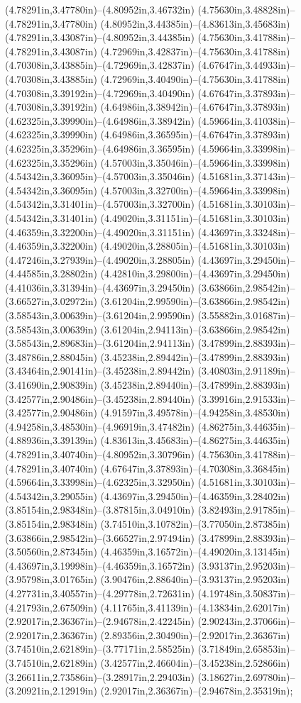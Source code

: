 (4.78291in,3.47780in)--(4.80952in,3.46732in) (4.75630in,3.48828in)--(4.78291in,3.47780in) (4.80952in,3.44385in)--(4.83613in,3.45683in) (4.78291in,3.43087in)--(4.80952in,3.44385in) (4.75630in,3.41788in)--(4.78291in,3.43087in) (4.72969in,3.42837in)--(4.75630in,3.41788in) (4.70308in,3.43885in)--(4.72969in,3.42837in) (4.67647in,3.44933in)--(4.70308in,3.43885in) (4.72969in,3.40490in)--(4.75630in,3.41788in) (4.70308in,3.39192in)--(4.72969in,3.40490in) (4.67647in,3.37893in)--(4.70308in,3.39192in) (4.64986in,3.38942in)--(4.67647in,3.37893in) (4.62325in,3.39990in)--(4.64986in,3.38942in) (4.59664in,3.41038in)--(4.62325in,3.39990in) (4.64986in,3.36595in)--(4.67647in,3.37893in) (4.62325in,3.35296in)--(4.64986in,3.36595in) (4.59664in,3.33998in)--(4.62325in,3.35296in) (4.57003in,3.35046in)--(4.59664in,3.33998in) (4.54342in,3.36095in)--(4.57003in,3.35046in) (4.51681in,3.37143in)--(4.54342in,3.36095in) (4.57003in,3.32700in)--(4.59664in,3.33998in) (4.54342in,3.31401in)--(4.57003in,3.32700in) (4.51681in,3.30103in)--(4.54342in,3.31401in) (4.49020in,3.31151in)--(4.51681in,3.30103in) (4.46359in,3.32200in)--(4.49020in,3.31151in) (4.43697in,3.33248in)--(4.46359in,3.32200in) (4.49020in,3.28805in)--(4.51681in,3.30103in) (4.47246in,3.27939in)--(4.49020in,3.28805in) (4.43697in,3.29450in)--(4.44585in,3.28802in) (4.42810in,3.29800in)--(4.43697in,3.29450in) (4.41036in,3.31394in)--(4.43697in,3.29450in) (3.63866in,2.98542in)--(3.66527in,3.02972in) (3.61204in,2.99590in)--(3.63866in,2.98542in) (3.58543in,3.00639in)--(3.61204in,2.99590in) (3.55882in,3.01687in)--(3.58543in,3.00639in) (3.61204in,2.94113in)--(3.63866in,2.98542in) (3.58543in,2.89683in)--(3.61204in,2.94113in) (3.47899in,2.88393in)--(3.48786in,2.88045in) (3.45238in,2.89442in)--(3.47899in,2.88393in) (3.43464in,2.90141in)--(3.45238in,2.89442in) (3.40803in,2.91189in)--(3.41690in,2.90839in) (3.45238in,2.89440in)--(3.47899in,2.88393in) (3.42577in,2.90486in)--(3.45238in,2.89440in) (3.39916in,2.91533in)--(3.42577in,2.90486in) (4.91597in,3.49578in)--(4.94258in,3.48530in) (4.94258in,3.48530in)--(4.96919in,3.47482in) (4.86275in,3.44635in)--(4.88936in,3.39139in) (4.83613in,3.45683in)--(4.86275in,3.44635in) (4.78291in,3.40740in)--(4.80952in,3.30796in) (4.75630in,3.41788in)--(4.78291in,3.40740in) (4.67647in,3.37893in)--(4.70308in,3.36845in) (4.59664in,3.33998in)--(4.62325in,3.32950in) (4.51681in,3.30103in)--(4.54342in,3.29055in) (4.43697in,3.29450in)--(4.46359in,3.28402in) (3.85154in,2.98348in)--(3.87815in,3.04910in) (3.82493in,2.91785in)--(3.85154in,2.98348in) (3.74510in,3.10782in)--(3.77050in,2.87385in) (3.63866in,2.98542in)--(3.66527in,2.97494in) (3.47899in,2.88393in)--(3.50560in,2.87345in) (4.46359in,3.16572in)--(4.49020in,3.13145in) (4.43697in,3.19998in)--(4.46359in,3.16572in) (3.93137in,2.95203in)--(3.95798in,3.01765in) (3.90476in,2.88640in)--(3.93137in,2.95203in) (4.27731in,3.40557in)--(4.29778in,2.72631in) (4.19748in,3.50837in)--(4.21793in,2.67509in) (4.11765in,3.41139in)--(4.13834in,2.62017in) (2.92017in,2.36367in)--(2.94678in,2.42245in) (2.90243in,2.37066in)--(2.92017in,2.36367in) (2.89356in,2.30490in)--(2.92017in,2.36367in) (3.74510in,2.62189in)--(3.77171in,2.58525in) (3.71849in,2.65853in)--(3.74510in,2.62189in) (3.42577in,2.46604in)--(3.45238in,2.52866in) (3.26611in,2.73586in)--(3.28917in,2.29403in) (3.18627in,2.69780in)--(3.20921in,2.12919in) (2.92017in,2.36367in)--(2.94678in,2.35319in);
